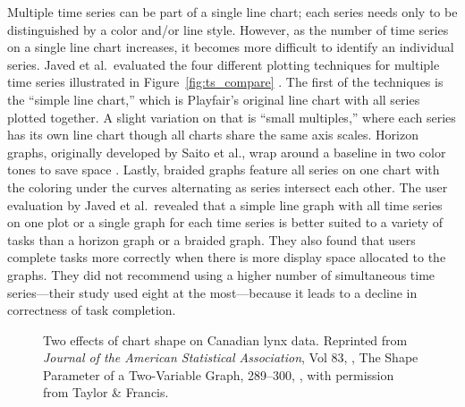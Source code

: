 Multiple time series can be part of a single line chart; each series needs only to be distinguished by a color and/or line style.  However, as the number of time series on a single line chart increases, it becomes more difficult to identify an individual series.  Javed et al.\ evaluated the four different plotting techniques for multiple time series illustrated in Figure~\ref{fig:ts_compare} \citeyearpar{javed2010}.  The first of the techniques is the ``simple line chart,'' which is Playfair's original line chart with all series plotted together.  A slight variation on that is ``small multiples,'' where each series has its own line chart though all charts share the same axis scales.  Horizon graphs, originally developed by Saito et al., wrap around a baseline in two color tones to save space \citeyearpar{saitoTwoTone}.  Lastly, braided graphs feature all series on one chart with the coloring under the curves alternating as series intersect each other.  The user evaluation by Javed et al.\ revealed that a simple line graph with all time series on one plot or a single graph for each time series is better suited to a variety of tasks than a horizon graph or a braided graph.  They also found that users complete tasks more correctly when there is more display space allocated to the graphs.  They did not recommend using a higher number of simultaneous time series---their study used eight at the most---because it leads to a decline in correctness of task completion.

\begin{figure}
	\centering
	\caption[Two effects of chart shape on Canadian lynx data]{Two effects of chart shape on Canadian lynx data.  Reprinted from \textit{Journal of the American Statistical Association}, Vol 83, \citeauthor{cleveland1988}, The Shape Parameter of a Two-Variable Graph, 289--300, \textcopyright \citeyear{cleveland1988}, with permission from Taylor \& Francis.}
	\label{fig:ratio}
\end{figure}

